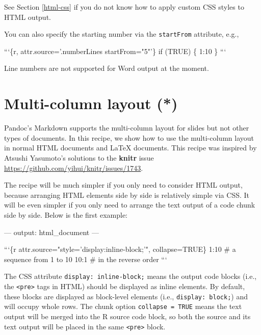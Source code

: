 \documentclass[
  11pt,
]{krantz}
\newenvironment{Shaded}{\begin{snugshade}}{\end{snugshade}}
\newcommand{\BaseNTok}[1]{\textcolor[rgb]{0.06,0.06,0.06}{#1}}
\newcommand{\NormalTok}[1]{#1}
\begin{document}
See Section \ref{html-css} if you do not know how to apply custom CSS styles to HTML output.

You can also specify the starting number via the \texttt{startFrom} attribute, e.g.,

\begin{Shaded}
\begin{Highlighting}[]
\BaseNTok{```\{r, attr.source='.numberLines startFrom="5"'\}}
\BaseNTok{if (TRUE) \{}
\BaseNTok{  1:10}
\BaseNTok{\}}
\BaseNTok{```}
\end{Highlighting}
\end{Shaded}

Line numbers are not supported for Word output at the moment.

\hypertarget{multi-column}{%
\section{Multi-column layout (*)}\label{multi-column}}

Pandoc's Markdown supports the multi-column layout for slides but not other types of documents. In this recipe, we show how to use the multi-column layout in normal HTML documents and LaTeX documents. This recipe was inspired by Atsushi Yasumoto's solutions to the \textbf{knitr} issue \url{https://github.com/yihui/knitr/issues/1743}.

The recipe will be much simpler if you only need to consider HTML output, because arranging HTML elements side by side is relatively simple via CSS. It will be even simpler if you only need to arrange the text output of a code chunk side by side. Below is the first example:

\begin{Shaded}
\begin{Highlighting}[]
\NormalTok{---}
\NormalTok{output: html_document}
\NormalTok{---}

\BaseNTok{```\{r attr.source="style='display:inline-block;'", collapse=TRUE\}}
\BaseNTok{1:10  # a sequence from 1 to 10}
\BaseNTok{10:1  # in the reverse order}
\BaseNTok{```}
\end{Highlighting}
\end{Shaded}

The CSS attribute \texttt{display:\ inline-block;} means the output code blocks (i.e., the \texttt{\textless{}pre\textgreater{}} tags in HTML) should be displayed as inline elements. By default, these blocks are displayed as block-level elements (i.e., \texttt{display:\ block;}) and will occupy whole rows. The chunk option \texttt{collapse\ =\ TRUE} means the text output will be merged into the R source code block, so both the source and its text output will be placed in the same \texttt{\textless{}pre\textgreater{}} block.
\end{document}
